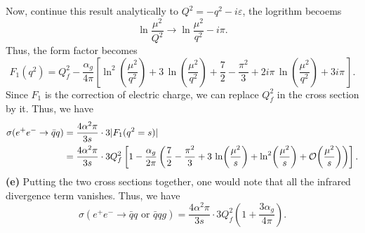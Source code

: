 \documentclass[11pt]{article}
\theoremstyle{definition}
\begin{document}
Now, continue this result analytically to $Q^2 = -q^2-i\varepsilon$, the logrithm becoems
\begin{equation}
    \ln\frac{\mu^2}{Q^2} \to \ln \frac{\mu^2}{q^2} - i\pi.
\end{equation}
Thus, the form factor becomes
\begin{equation} 
    F_1(q^2) = Q_f^2 - \frac{\alpha_g}{4\pi}\left[
                    \ln^{2}\!\left(\frac{\mu^{2}}{q^{2}}\right)
                    + 3\,\ln\!\left(\frac{\mu^{2}}{q^{2}}\right)
                    + \frac{7}{2} - \frac{\pi^{2}}{3}
                    + 2 i \pi \,\ln\!\left(\frac{\mu^{2}}{q^{2}}\right)
                    + 3 i \pi \,\right].
\end{equation}
Since $F_1$ is the correction of electric charge, we can replace $Q_f^2$ in the cross section by it. Thus, we have
\begin{equation}
\begin{aligned}
    \sigma(e^+e^-\to\bar{q}q) &=\frac{4\alpha^2\pi}{3s}\cdot 3|F_1(q^2=s)|\\
    &=\frac{4\alpha^2\pi}{3s}\cdot 3Q_f^2\left[1 - \frac{\alpha_g}{2\pi}\left(\frac{7}{2}
                    - \frac{\pi^{2}}{3}
                    + 3\,\ln\!\left(\frac{\mu^{2}}{s}\right)
                    + \ln^{2}\!\left(\frac{\mu^{2}}{s}\right) + \order{\frac{\mu^2}{s}}\right)\right].
\end{aligned}
\end{equation}
\textbf{(e)} Putting the two cross sections together, one would note that all the infrared divergence term vanishes. Thus, we have
\begin{equation}
\boxed{
    \sigma(e^+e^- \to \bar{q}q \text{ or }\bar{q}qg) = \frac{4\alpha^2\pi}{3s}\cdot 3Q_f^2\left(1+\frac{3\alpha_g}{4\pi}\right).}
\end{equation}
\end{document}
